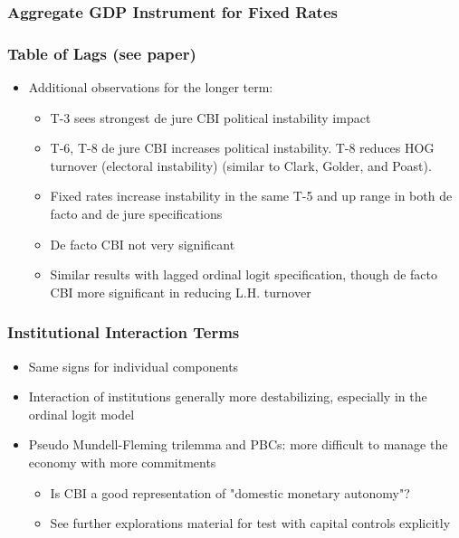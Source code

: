 \documentclass{beamer}
\begin{document}
    \begin{frame}
        \frametitle{Aggregate GDP Instrument for Fixed Rates}
        {
            \let\oldcentering\centering
            \renewcommand\centering{\tiny\oldcentering}
            
        }
    \end{frame}

    \begin{frame}
        \frametitle{Table of Lags (see paper)}
        \begin{itemize}
            \item Additional observations for the longer term:
            \begin{itemize}
                \item T-3 sees strongest de jure CBI political instability impact
                \item T-6, T-8 de jure CBI increases political instability. T-8 reduces HOG turnover (electoral instability) (similar to Clark, Golder, and Poast).
                \item Fixed rates increase instability in the same T-5 and up range in both de facto and de jure specifications
                \item De facto CBI not very significant
                \item Similar results with lagged ordinal logit specification, though de facto CBI more significant in reducing L.H. turnover
            \end{itemize}
        \end{itemize}
    \end{frame}

    \begin{frame}
        \frametitle{Institutional Interaction Terms}
        \begin{itemize}
            \item Same signs for individual components
            \item Interaction of institutions generally more destabilizing, especially in the ordinal logit model
            \item Pseudo Mundell-Fleming trilemma and PBCs: more difficult to manage the economy with more commitments
            \begin{itemize}
                \item Is CBI a good representation of "domestic monetary autonomy"?
                \item See further explorations material for test with capital controls explicitly
            \end{itemize}
        \end{itemize}
    \end{frame}
\end{document}
